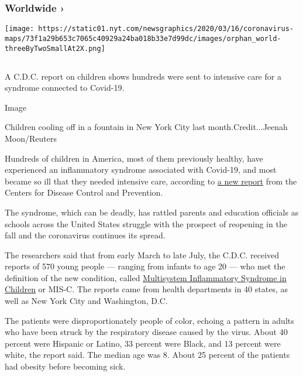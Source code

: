 \hypertarget{worldwide-}{%
\subsubsection{Worldwide ›}\label{worldwide-}}

\texttt{[image: https://static01.nyt.com/newsgraphics/2020/03/16/coronavirus-maps/73f1a29b653c7065c40929a24ba018b33e7d99dc/images/orphan\_world-threeByTwoSmallAt2X.png]}

\hypertarget{section-1}{%
\subsection{}\label{section-1}}

A C.D.C. report on children shows hundreds were sent to intensive care
for a syndrome connected to Covid-19.

Image

Children cooling off in a fountain in New York City last
month.Credit...Jeenah Moon/Reuters

Hundreds of children in America, most of them previously healthy, have
experienced an inflammatory syndrome associated with Covid-19, and most
became so ill that they needed intensive care, according to
\href{https://www.cdc.gov/mmwr/volumes/69/wr/mm6932e2.htm?s_cid=mm6932e2_w\#T1_down}{a
new report} from the Centers for Disease Control and Prevention.

The syndrome, which can be deadly, has rattled parents and education
officials as schools across the United States struggle with the prospect
of reopening in the fall and the coronavirus continues its spread.

The researchers said that from early March to late July, the C.D.C.
received reports of 570 young people --- ranging from infants to age 20
--- who met the definition of the new condition, called
\href{https://www.nytimes.com/2020/05/17/health/coronavirus-multisystem-fnflammatory-syndrome-children-teenagers.html}{Multisystem
Inflammatory Syndrome in Children} or MIS-C. The reports came from
health departments in 40 states, as well as New York City and
Washington, D.C.

The patients were disproportionately people of color, echoing a pattern
in adults who have been struck by the respiratory disease caused by the
virus. About 40 percent were Hispanic or Latino, 33 percent were Black,
and 13 percent were white, the report said. The median age was 8. About
25 percent of the patients had obesity before becoming sick.

